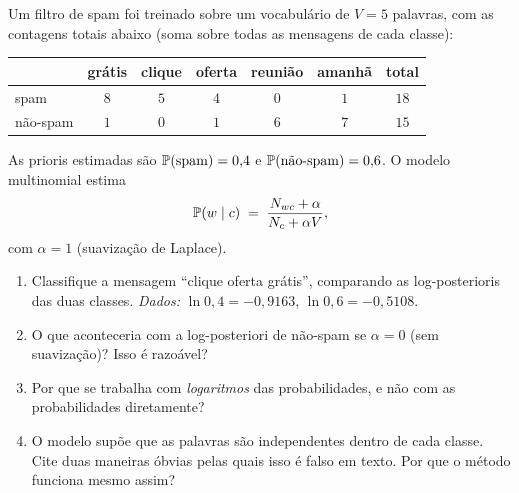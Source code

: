 \documentclass[11pt,a4paper]{article}
\begin{document}
\begin{exercicio}
Um filtro de spam foi treinado sobre um vocabulário de $V=5$ palavras, com as
contagens totais abaixo (soma sobre todas as mensagens de cada classe):
\begin{center}\small
\renewcommand{\arraystretch}{1.25}
\begin{tabular}{@{}lccccc|c@{}}
\toprule
        & grátis & clique & oferta & reunião & amanhã & total \\
\midrule
spam    & $8$ & $5$ & $4$ & $0$ & $1$ & $18$ \\
não-spam& $1$ & $0$ & $1$ & $6$ & $7$ & $15$ \\
\bottomrule
\end{tabular}
\end{center}
As prioris estimadas são $\mathbb{P}(\text{spam})=0{,}4$ e
$\mathbb{P}(\text{não-spam})=0{,}6$. O modelo multinomial estima
\[
  \mathbb{P}(w \mid c) \;=\; \frac{N_{wc} + \alpha}{N_c + \alpha V},
\]
com $\alpha=1$ (suavização de Laplace).
\begin{enumerate}[label=(\alph*),leftmargin=1.1cm]
  \item Classifique a mensagem ``clique oferta grátis'', comparando as
        log-posterioris das duas classes.
        \emph{Dados:} $\ln 0{,}4 = -0{,}9163$, $\ln 0{,}6 = -0{,}5108$.
  \item O que aconteceria com a log-posteriori de não-spam se $\alpha=0$ (sem
        suavização)? Isso é razoável?
  \item Por que se trabalha com \emph{logaritmos} das probabilidades, e não com
        as probabilidades diretamente?
  \item O modelo supõe que as palavras são independentes dentro de cada classe.
        Cite duas maneiras óbvias pelas quais isso é falso em texto. Por que o
        método funciona mesmo assim?
\end{enumerate}
\end{exercicio}
\end{document}
